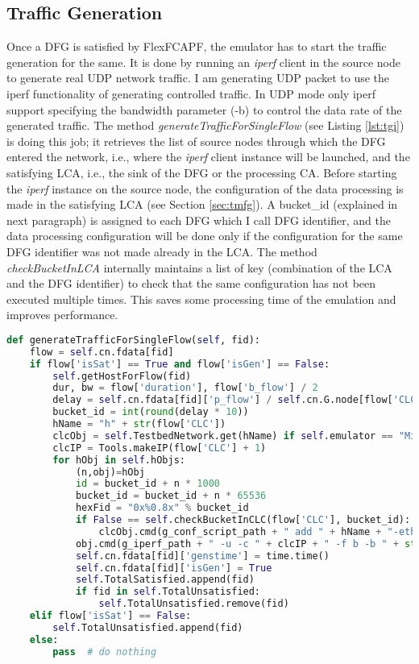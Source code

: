 \subsection{Traffic Generation}\label{sec:tragen}
Once a DFG is satisfied by FlexFCAPF, the emulator has to start the traffic generation for the same. It is done by running an \textit{iperf} client in the source node to generate real UDP network traffic. I am generating UDP packet to use the iperf functionality of generating controlled traffic. In UDP mode only iperf support specifying the bandwidth parameter (-b) to control the data rate of the generated traffic. The method \textit{generateTrafficForSingleFlow} (see Listing \ref{lst:tgi}) is doing this job; it retrieves the list of source nodes through which the DFG entered the network, i.e., where the \textit{iperf} client instance will be launched, and the satisfying LCA, i.e., the sink of the DFG or the processing CA. Before starting the \textit{iperf} instance on the source node, the configuration of the data processing is made in the satisfying LCA (see Section \ref{sec:tmfg}). A bucket\_id (explained in next paragraph) is assigned to each DFG which I call DFG identifier, and the data processing configuration will be done only if the configuration for the same DFG identifier was not made already in the LCA. The method \textit{checkBucketInLCA} internally maintains a list of key (combination of the LCA and the DFG identifier) to check that the same configuration has not been executed multiple times. This saves some processing time of the emulation and improves performance.

\begin{lstlisting}[caption={Traffic generation implementation},label={lst:tgi},language=python,tabsize=2,basicstyle=\footnotesize,breaklines=true,showspaces=false,showstringspaces=false,showtabs=false,frame=single]
def generateTrafficForSingleFlow(self, fid):
	flow = self.cn.fdata[fid]
	if flow['isSat'] == True and flow['isGen'] == False:
		self.getHostForFlow(fid)
		dur, bw = flow['duration'], flow['b_flow'] / 2
		delay = self.cn.fdata[fid]['p_flow'] / self.cn.G.node[flow['CLC']]['ProcFlow'][fid] * 1000
		bucket_id = int(round(delay * 10))
		hName = "h" + str(flow['CLC'])
		clcObj = self.TestbedNetwork.get(hName) if self.emulator == "Mininet" else self.TestbedNetwork.get_node(hName)
		clcIP = Tools.makeIP(flow['CLC'] + 1)
		for hObj in self.hObjs:
			(n,obj)=hObj
			id = bucket_id + n * 1000
			bucket_id = bucket_id + n * 65536
			hexFid = "0x%0.8x" % bucket_id
			if False == self.checkBucketInCLC(flow['CLC'], bucket_id):
				clcObj.cmd(g_conf_script_path + " add " + hName + "-eth0 1 " + str(id) + " " + str(delay) + " " + hexFid)
			obj.cmd(g_iperf_path + " -u -c " + clcIP + " -f b -b " + str(bw) + " -t " + str(dur) + " -k " + str(bucket_id) + " > /tmp/iperf_client_" + str(fid) + "_" + str(bw) + "_" + str(dur) + "_" + str(obj.name) + "_to_" + str(hName) + ".log &")
			self.cn.fdata[fid]['genstime'] = time.time()
			self.cn.fdata[fid]['isGen'] = True
			self.TotalSatisfied.append(fid)
			if fid in self.TotalUnsatisfied:
				self.TotalUnsatisfied.remove(fid)
	elif flow['isSat'] == False:
		self.TotalUnsatisfied.append(fid)
	else:
		pass  # do nothing
\end{lstlisting}

